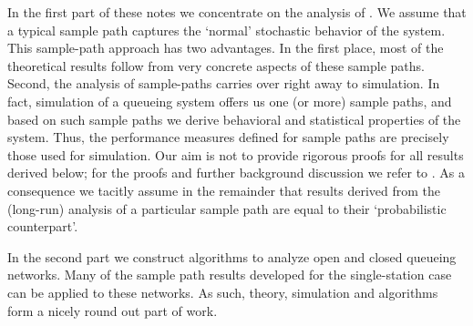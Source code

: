 In the first part of these notes we concentrate on the analysis of
. We assume that a typical
sample path captures the `normal' stochastic behavior of the
system. This sample-path approach has two advantages. In the first
place, most of the theoretical results follow from very concrete
aspects of these sample paths. Second, the analysis of sample-paths
carries over right away to simulation. In fact, simulation of a
queueing system offers us one (or more) sample paths, and based on
such sample paths we derive behavioral and statistical properties of
the system. Thus, the performance measures defined for sample paths
are precisely those used for simulation.  Our aim is not to provide
rigorous proofs for all results derived below; for the proofs and
further background discussion we refer to
\cite{el-taha98:_sampl_path_analy_queuein_system}. As a consequence we tacitly
assume in the remainder that results derived from the (long-run)
analysis of a particular sample path are equal to their `probabilistic
counterpart'. 

In the second part we construct algorithms to analyze open and closed
queueing networks. Many of the sample path results developed for the
single-station case can be applied to these networks. As such, theory,
simulation and algorithms form a nicely round out part of work. 

